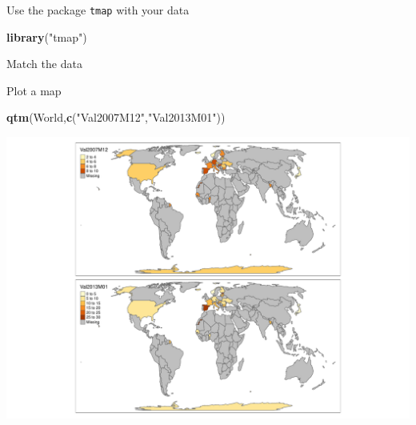 \documentclass[
  ignorenonframetext,
]{beamer}
\newenvironment{Shaded}{\begin{snugshade}}{\end{snugshade}}
\newcommand{\DecValTok}[1]{\textcolor[rgb]{0.00,0.00,0.81}{#1}}
\newcommand{\KeywordTok}[1]{\textcolor[rgb]{0.13,0.29,0.53}{\textbf{#1}}}
\newcommand{\NormalTok}[1]{#1}
\newcommand{\OperatorTok}[1]{\textcolor[rgb]{0.81,0.36,0.00}{\textbf{#1}}}
\newcommand{\StringTok}[1]{\textcolor[rgb]{0.31,0.60,0.02}{#1}}
\begin{document}
\begin{frame}[fragile]{Use the package \texttt{tmap} with your data}
\protect\hypertarget{use-the-package-tmap-with-your-data}{}
\begin{Shaded}
\begin{Highlighting}[]
\KeywordTok{library}\NormalTok{(}\StringTok{"tmap"}\NormalTok{)}
\end{Highlighting}
\end{Shaded}

\begin{block}{Match the data}
\protect\hypertarget{match-the-data}{}
\begin{Shaded}
\end{Shaded}
\end{block}
\end{frame}

\begin{frame}[fragile]{Plot a map}
\protect\hypertarget{plot-a-map}{}
\begin{Shaded}
\begin{Highlighting}[]
\KeywordTok{qtm}\NormalTok{(World,}\KeywordTok{c}\NormalTok{(}\StringTok{"Val2007M12"}\NormalTok{,}\StringTok{"Val2013M01"}\NormalTok{))}
\end{Highlighting}
\end{Shaded}

\includegraphics{quick_high_quality_maps_files/figure-beamer/unnamed-chunk-27-1.pdf}
\end{frame}
\end{document}
